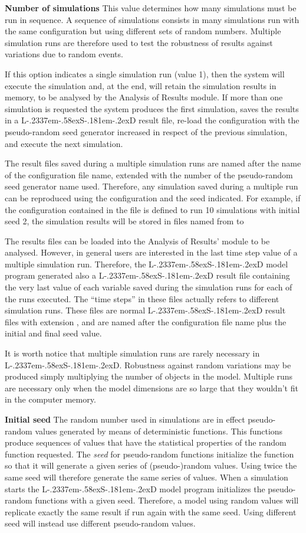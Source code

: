 \documentclass [11pt,a4paper] {book}
\def\LsD{{L\kern-.2337em\lower-.58ex\hbox{S}\kern-.181em\lower-.2ex\hbox{D}}\xspace}
\begin{document}
\textbf{Number of simulations}
This value determines how many simulations must be run in sequence. A sequence of simulations consists in many simulations run with the same configuration but using different sets of random numbers. Multiple simulation runs are therefore used to test the robustness of results against variations due to random events.


If this option indicates a single simulation run (value 1), then the system will execute the simulation and, at the end, will retain the simulation results in memory, to be analysed by the Analysis of Results module. If more than one simulation is requested the system produces the first simulation, saves the results in a \LsD result file, re-load the configuration with the pseudo-random seed generator increased in respect of the previous simulation, and execute the next simulation.

The result files saved during a multiple simulation runs are named after the name of the configuration file name, extended with the number of the pseudo-random seed generator name used. Therefore, any simulation  saved during a multiple run can be reproduced using the configuration and the seed indicated. For example, if the configuration contained in the file  is defined to run 10 simulations with initial seed 2, the simulation results will be stored in files named from  to 

The results files can be loaded into the Analysis of Results' module to be analysed. However, in general users are interested in the last time step value of a multiple simulation run. Therefore, the \LsD model program generated also a \LsD result file containing the very last value of each variable saved during the simulation runs for each of the runs executed. The ``time steps'' in these files actually refers to different simulation runs. These files are normal \LsD result files with extension , and are named after the configuration file name plus the initial and final seed value.

It is worth notice that multiple simulation runs are rarely necessary in \LsD. Robustness against random variations may be produced simply multiplying the number of objects in the model. Multiple runs are necessary only when the model dimensions are so large that they wouldn't fit in the computer memory.


\textbf{Initial seed} 
The random number used in simulations are in effect pseudo-random values generated by means of deterministic functions. This functions produce sequences of values that have the statistical properties of the random function requested. The \textit{seed} for pseudo-random functions initialize the function so that it will generate a given series of (pseudo-)random values. Using twice the same seed will therefore generate the same series of values. When a simulation starts the \LsD model program initializes the pseudo-random functions with a given seed. Therefore, a model using random values will replicate exactly the same result if run again with the same seed. Using different seed will instead use different pseudo-random values.
\end{document}
